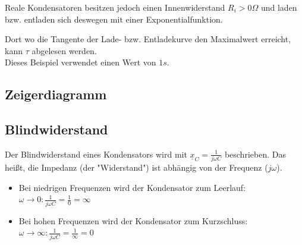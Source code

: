 \begin{center}
\end{center}

Reale Kondensatoren besitzen jedoch einen Innenwiderstand $R_i > 0 \Omega$ und laden bzw. entladen sich deswegen mit einer Exponentialfunktion.

\begin{center}
\end{center}

Dort wo die Tangente der Lade- bzw. Entladekurve den Maximalwert erreicht, kann $\tau$ abgelesen werden. \\
Dieses Beispiel verwendet einen Wert von $1s$.

\subsection{Zeigerdiagramm}

\newpage

\subsection{Blindwiderstand}
Der Blindwiderstand eines Kondensators wird mit $\underline{x}_C=\frac{1}{j\omega C}$ beschrieben. Das heißt, die Impedanz (der "Widerstand") ist abhängig von der Frequenz ($j\omega$).
\begin{itemize}
    \item Bei niedrigen Frequenzen wird der Kondensator zum Leerlauf:\\
    $\omega \rightarrow 0: \frac{1}{j\omega C} = \frac{1}{0} = \infty$

    \item Bei hohen Frequenzen wird der Kondensator zum Kurzschluss:\\
    $\omega \rightarrow \infty: \frac{1}{j\omega C} = \frac{1}{\infty} = 0$
\end{itemize}

